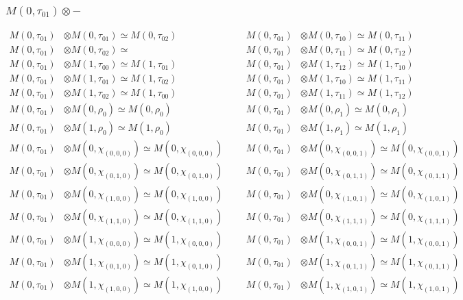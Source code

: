 \subsubsection{$ M(0,\tau_{01})\otimes -$}
\begin{align*}
M(0,\tau_{01}) &\otimes M(0,\tau_{01}) \simeq M(0,\tau_{02}) &&& M(0,\tau_{01}) &\otimes M(0,\tau_{10}) \simeq M(0,\tau_{11})\\
M(0,\tau_{01}) &\otimes M(0,\tau_{02}) \simeq  &&& M(0,\tau_{01}) &\otimes M(0,\tau_{11}) \simeq M(0,\tau_{12})\\
M(0,\tau_{01}) &\otimes M(1,\tau_{00}) \simeq M(1,\tau_{01}) &&& M(0,\tau_{01}) &\otimes M(1,\tau_{12}) \simeq M(1,\tau_{10})\\
M(0,\tau_{01}) &\otimes M(1,\tau_{01}) \simeq M(1,\tau_{02}) &&& M(0,\tau_{01}) &\otimes M(1,\tau_{10}) \simeq M(1,\tau_{11})\\
M(0,\tau_{01}) &\otimes M(1,\tau_{02}) \simeq M(1,\tau_{00}) &&& M(0,\tau_{01}) &\otimes M(1,\tau_{11}) \simeq M(1,\tau_{12})\\
M(0,\tau_{01}) &\otimes M(0,\rho_{0}) \simeq M(0,\rho_{0}) &&& M(0,\tau_{01}) &\otimes M(0,\rho_{1}) \simeq M(0,\rho_{1})\\
M(0,\tau_{01}) &\otimes M(1,\rho_{0}) \simeq M(1,\rho_{0}) &&& M(0,\tau_{01}) &\otimes M(1,\rho_{1}) \simeq M(1,\rho_{1})\\
M(0,\tau_{01}) &\otimes M(0,\chi_{(0,0,0)}) \simeq M(0,\chi_{(0,0,0)}) &&& M(0,\tau_{01}) &\otimes M(0,\chi_{(0,0,1)}) \simeq M(0,\chi_{(0,0,1)})\\
M(0,\tau_{01}) &\otimes M(0,\chi_{(0,1,0)}) \simeq M(0,\chi_{(0,1,0)}) &&& M(0,\tau_{01}) &\otimes M(0,\chi_{(0,1,1)}) \simeq M(0,\chi_{(0,1,1)})\\
M(0,\tau_{01}) &\otimes M(0,\chi_{(1,0,0)}) \simeq M(0,\chi_{(1,0,0)}) &&& M(0,\tau_{01}) &\otimes M(0,\chi_{(1,0,1)}) \simeq M(0,\chi_{(1,0,1)})\\
M(0,\tau_{01}) &\otimes M(0,\chi_{(1,1,0)}) \simeq M(0,\chi_{(1,1,0)}) &&& M(0,\tau_{01}) &\otimes M(0,\chi_{(1,1,1)}) \simeq M(0,\chi_{(1,1,1)})\\
M(0,\tau_{01}) &\otimes M(1,\chi_{(0,0,0)}) \simeq M(1,\chi_{(0,0,0)}) &&& M(0,\tau_{01}) &\otimes M(1,\chi_{(0,0,1)}) \simeq M(1,\chi_{(0,0,1)})\\
M(0,\tau_{01}) &\otimes M(1,\chi_{(0,1,0)}) \simeq M(1,\chi_{(0,1,0)}) &&& M(0,\tau_{01}) &\otimes M(1,\chi_{(0,1,1)}) \simeq M(1,\chi_{(0,1,1)})\\
M(0,\tau_{01}) &\otimes M(1,\chi_{(1,0,0)}) \simeq M(1,\chi_{(1,0,0)}) &&& M(0,\tau_{01}) &\otimes M(1,\chi_{(1,0,1)}) \simeq M(1,\chi_{(1,0,1)})\\

\end{align*}
